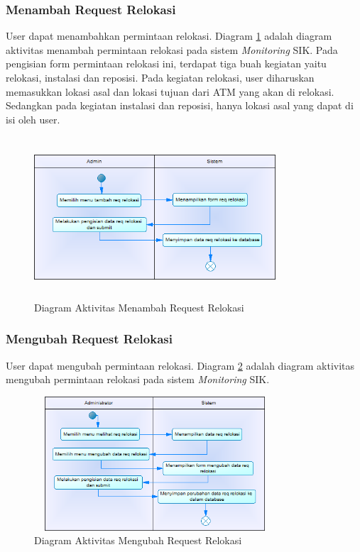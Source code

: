 	\subsubsection{Menambah Request Relokasi}
	User dapat menambahkan permintaan relokasi. Diagram \ref{figure:activity_menambah_req_relokasi} adalah diagram aktivitas menambah permintaan relokasi pada sistem \textit{Monitoring} SIK. Pada pengisian form permintaan relokasi ini, terdapat tiga buah kegiatan yaitu relokasi, instalasi dan reposisi. Pada kegiatan relokasi, user diharuskan memasukkan lokasi asal dan lokasi tujuan dari ATM yang akan di relokasi. Sedangkan pada kegiatan instalasi dan reposisi, hanya lokasi asal yang dapat di isi oleh user.
	\begin{figure}[h]
	\centerline {\includegraphics[width=9cm,height=6cm]{bab4/ActivityDiagram_MenambahkanReqRelokasi.png}}
	\caption{Diagram Aktivitas Menambah Request Relokasi}
	\label{figure:activity_menambah_req_relokasi}
	\end{figure}
		
	\subsubsection{Mengubah Request Relokasi}
	User dapat mengubah permintaan relokasi. Diagram \ref{figure:activity_mengubah_req_relokasi} adalah diagram aktivitas mengubah permintaan relokasi pada sistem \textit{Monitoring} SIK.
	\begin{figure}[h]
	\centerline {\includegraphics[width=9cm,height=5cm]{bab4/ActivityDiagram_MengubahReqRelokasi.png}}
	\caption{Diagram Aktivitas Mengubah Request Relokasi}
	\label{figure:activity_mengubah_req_relokasi}
	\end{figure}

